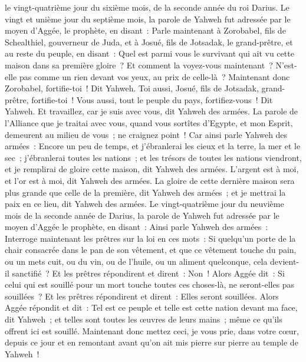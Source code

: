\begin{multicols}{2}
le vingt-quatrième jour du sixième mois, de la seconde année du roi Darius.
\VerseOne{}Le vingt et unième jour du septième mois, la parole de Yahweh fut adressée par le moyen d'Aggée, le prophète, en disant~:
Parle maintenant à Zorobabel, fils de Schealthiel, gouverneur de Juda, et à Josué, fils de Jotsadak, le grand-prêtre, et au reste du peuple, en disant~:
Quel est parmi vous le survivant qui ait vu cette maison dans sa première gloire~? Et comment la voyez-vous maintenant~? N'est-elle pas comme un rien devant vos yeux, au prix de celle-là~?
Maintenant donc Zorobabel, fortifie-toi~! Dit Yahweh. Toi aussi, Josué, fils de Jotsadak, grand-prêtre, fortifie-toi~! Vous aussi, tout le peuple du pays, fortifiez-vous~! Dit Yahweh. Et travaillez, car je suis avec vous, dit Yahweh des armées.
La parole de l'Alliance que je traitai avec vous, quand vous sortîtes d'Egypte, et mon Esprit, demeurent au milieu de vous~; ne craignez point~!
Car ainsi parle Yahweh des armées~: Encore un peu de temps, et j'ébranlerai les cieux et la terre, la mer et le sec~;
j'ébranlerai toutes les nations~; et les trésors de toutes les nations viendront, et je remplirai de gloire cette maison, dit Yahweh des armées.
L'argent est à moi, et l'or est à moi, dit Yahweh des armées.
La gloire de cette dernière maison sera plus grande que celle de la première, dit Yahweh des armées~; et je mettrai la paix en ce lieu, dit Yahweh des armées.
Le vingt-quatrième jour du neuvième mois de la seconde année de Darius, la parole de Yahweh fut adressée par le moyen d'Aggée le prophète, en disant~:
Ainsi parle Yahweh des armées~: Interroge maintenant les prêtres sur la loi en ces mots~:
Si quelqu'un porte de la chair consacrée dans le pan de son vêtement, et que ce vêtement touche du pain, ou un mets cuit, ou du vin, ou de l'huile, ou un aliment quelconque, cela devient-il sanctifié~? Et les prêtres répondirent et dirent~: Non~!
Alors Aggée dit~: Si celui qui est souillé pour un mort touche toutes ces choses-là, ne seront-elles pas souillées~? Et les prêtres répondirent et dirent~: Elles seront souillées.
Alors Aggée répondit et dit~: Tel est ce peuple et telle est cette nation devant ma face, dit Yahweh~; et telles sont toutes les œuvres de leurs mains~; même ce qu'ils offrent ici est souillé.
Maintenant donc mettez ceci, je vous prie, dans votre cœur, depuis ce jour et en remontant avant qu'on ait mis pierre sur pierre au temple de Yahweh~!

\end{multicols}
